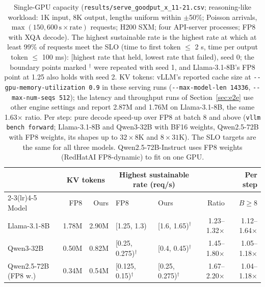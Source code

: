 \begin{table}[tbp]
\centering
\caption{Single-GPU capacity (\texttt{results/serve\_goodput\_x\_11-21.csv}; reasoning-like workload: 1K input, 8K output, lengths uniform within $\pm$50\%; Poisson arrivals, $\max(150, 600\,\mathrm{s} \times \mathrm{rate})$ requests; H200 SXM; four API-server processes; FP8 with XQA decode). The highest sustainable rate is the highest rate at which at least 99\% of requests meet the SLO (time to first token $\leq$ 2 s, time per output token $\leq$ 100 ms): [highest rate that held, lowest rate that failed), seed 0; the boundary points marked $^{\dagger}$ were repeated with seed 1, and Llama-3.1-8B's FP8 point at 1.25 also holds with seed 2. KV tokens: vLLM's reported cache size at \texttt{-{}-gpu-memory-utilization 0.9} in these serving runs (\texttt{-{}-max-model-len 14336}, \texttt{-{}-max-num-seqs 512}); the latency and throughput runs of Section~\ref{sec:e2e} use other engine settings and report 2.87M and 1.76M on Llama-3.1-8B, the same 1.63$\times$ ratio. Per step: pure decode speed-up over FP8 at batch 8 and above (\texttt{vllm bench forward}; Llama-3.1-8B and Qwen3-32B with BF16 weights, Qwen2.5-72B with FP8 weights, its shapes up to $32 \times 8$K and $8 \times 31$K). The SLO targets are the same for all three models. Qwen2.5-72B-Instruct uses FP8 weights (RedHatAI FP8-dynamic) to fit on one GPU.}
\label{tab:capacity}
\small\setlength{\tabcolsep}{3pt}
\begin{tabular}{@{}lrrllrr@{}}
\toprule
 & \multicolumn{2}{c}{KV tokens} & \multicolumn{2}{c}{Highest sustainable rate (req/s)} & & Per step \\
\cmidrule(lr){2-3}\cmidrule(lr){4-5}
Model & FP8 & Ours & FP8 & Ours & Ratio & $B \geq 8$ \\
\midrule
Llama-3.1-8B          & 1.78M & 2.90M & [1.25, 1.3)  & [1.6, 1.65)$^{\dagger}$  & 1.23--1.32$\times$ & 1.12--1.64$\times$ \\
Qwen3-32B             & 0.50M & 0.82M & [0.25, 0.275)$^{\dagger}$ & [0.4, 0.45)$^{\dagger}$  & 1.45--1.80$\times$ & 1.05--1.18$\times$ \\
Qwen2.5-72B (FP8 w.)  & 0.34M & 0.54M & [0.125, 0.15)$^{\dagger}$ & [0.25, 0.275)$^{\dagger}$ & 1.67--2.20$\times$ & 1.04--1.18$\times$ \\
\bottomrule
\end{tabular}
\end{table}
